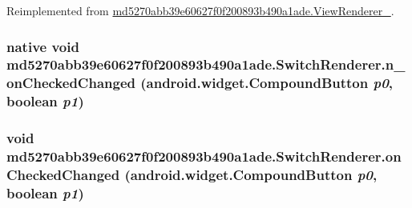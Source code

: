 Reimplemented from \hyperlink{classmd5270abb39e60627f0f200893b490a1ade_1_1_view_renderer__2_4832372c2c5755cd4e9f279f9b051454}{md5270abb39e60627f0f200893b490a1ade.ViewRenderer\_}.\hypertarget{classmd5270abb39e60627f0f200893b490a1ade_1_1_switch_renderer_d23030fbecb761ed1f07b9bbedb69913}{
\subsubsection[{n\_\-onCheckedChanged}]{\setlength{\rightskip}{0pt plus 5cm}native void md5270abb39e60627f0f200893b490a1ade.SwitchRenderer.n\_\-onCheckedChanged (android.widget.CompoundButton {\em p0}, \/  boolean {\em p1})}}
\label{classmd5270abb39e60627f0f200893b490a1ade_1_1_switch_renderer_d23030fbecb761ed1f07b9bbedb69913}


\hypertarget{classmd5270abb39e60627f0f200893b490a1ade_1_1_switch_renderer_ef153bafa3b4b8c95620b6c59d403578}{
\subsubsection[{onCheckedChanged}]{\setlength{\rightskip}{0pt plus 5cm}void md5270abb39e60627f0f200893b490a1ade.SwitchRenderer.onCheckedChanged (android.widget.CompoundButton {\em p0}, \/  boolean {\em p1})}}
\label{classmd5270abb39e60627f0f200893b490a1ade_1_1_switch_renderer_ef153bafa3b4b8c95620b6c59d403578}




